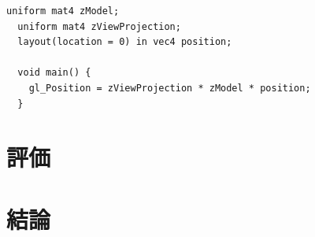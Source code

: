 \begin{lstlisting}[caption=本システムでのVertex Shaderの例, label=code:zigen-vertex-shader]
  uniform mat4 zModel;
  uniform mat4 zViewProjection;
  layout(location = 0) in vec4 position;
  
  void main() {
    gl_Position = zViewProjection * zModel * position;
  }
\end{lstlisting}




\section{評価}


\section{結論}

